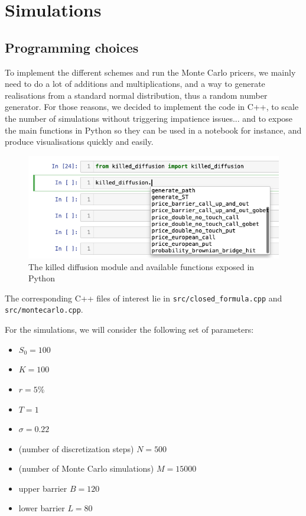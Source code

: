 \section{Simulations}

\subsection{Programming choices}

To implement the different schemes and run the Monte Carlo pricers, we mainly need to do a lot of additions and multiplications, and a way to generate realisations from a standard normal distribution, thus a random number generator. For those reasons, we decided to implement the code in C++, to scale the number of simulations without triggering impatience issues... and to expose the main functions in Python so they can be used in a notebook for instance, and produce visualisations quickly and easily.\\


\begin{figure}[H]
    \centering
    \includegraphics[width=0.6\linewidth]{img/killed_module.png}
    \caption{The killed diffusion module and available functions exposed in Python}
    \label{fig:module}
\end{figure}

The corresponding C++ files of interest lie in \texttt{src/closed_formula.cpp} and \texttt{src/montecarlo.cpp}.


For the simulations, we will consider the following set of parameters:
\begin{itemize}
    \item $S_0 = 100$
    \item $K = 100$
    \item $r = 5\%$
    \item $T = 1$
    \item $\sigma = 0.22$
    \item (number of discretization steps) $N = 500$
    \item (number of Monte Carlo simulations) $M = 15000$
    \item upper barrier $B = 120$
    \item lower barrier $L = 80$  
    
\end{itemize}

